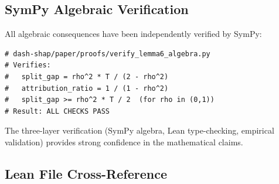 \documentclass{jmlr}
\begin{document}
\subsection{SymPy Algebraic Verification}

All algebraic consequences have been independently verified by SymPy:

\begin{verbatim}
# dash-shap/paper/proofs/verify_lemma6_algebra.py
# Verifies:
#   split_gap = rho^2 * T / (2 - rho^2)
#   attribution_ratio = 1 / (1 - rho^2)
#   split_gap >= rho^2 * T / 2  (for rho in (0,1))
# Result: ALL CHECKS PASS
\end{verbatim}

The three-layer verification (SymPy algebra, Lean type-checking, empirical validation) provides strong confidence in the mathematical claims.

\subsection{Lean File Cross-Reference}
\end{document}
